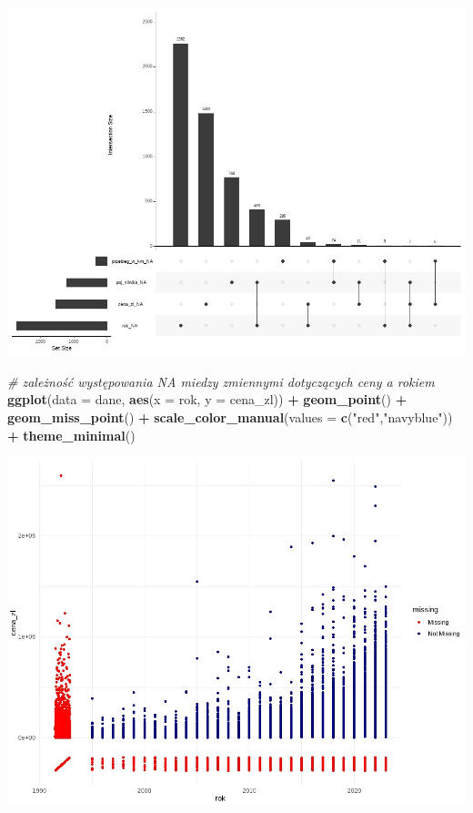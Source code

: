 \documentclass[
]{article}
\newenvironment{Shaded}{\begin{snugshade}}{\end{snugshade}}
\newcommand{\AttributeTok}[1]{\textcolor[rgb]{0.13,0.29,0.53}{#1}}
\newcommand{\CommentTok}[1]{\textcolor[rgb]{0.56,0.35,0.01}{\textit{#1}}}
\newcommand{\FunctionTok}[1]{\textcolor[rgb]{0.13,0.29,0.53}{\textbf{#1}}}
\newcommand{\NormalTok}[1]{#1}
\newcommand{\SpecialCharTok}[1]{\textcolor[rgb]{0.81,0.36,0.00}{\textbf{#1}}}
\newcommand{\StringTok}[1]{\textcolor[rgb]{0.31,0.60,0.02}{#1}}
\begin{document}
\includegraphics[width=1\linewidth]{images/2}

\begin{Shaded}
\begin{Highlighting}[]
\CommentTok{\# zależność występowania NA miedzy zmiennymi dotyczących ceny a rokiem }
\FunctionTok{ggplot}\NormalTok{(}\AttributeTok{data =}\NormalTok{ dane, }\FunctionTok{aes}\NormalTok{(}\AttributeTok{x =}\NormalTok{ rok, }\AttributeTok{y =}\NormalTok{ cena\_zl)) }\SpecialCharTok{+} 
  \FunctionTok{geom\_point}\NormalTok{() }\SpecialCharTok{+}
  \FunctionTok{geom\_miss\_point}\NormalTok{() }\SpecialCharTok{+}
  \FunctionTok{scale\_color\_manual}\NormalTok{(}\AttributeTok{values =} \FunctionTok{c}\NormalTok{(}\StringTok{"red"}\NormalTok{,}\StringTok{"navyblue"}\NormalTok{)) }\SpecialCharTok{+}
  \FunctionTok{theme\_minimal}\NormalTok{()}
\end{Highlighting}
\end{Shaded}

\includegraphics[width=1\linewidth]{images/3}
\end{document}
